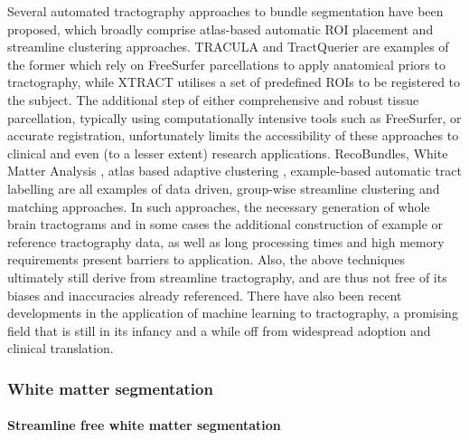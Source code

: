 Several automated tractography approaches to bundle segmentation have been proposed, which broadly comprise atlas-based automatic ROI placement and streamline clustering approaches.
TRACULA and TractQuerier are examples of the former which rely on FreeSurfer parcellations to apply anatomical priors to tractography, while XTRACT \autocite{Warrington2020} utilises a set of predefined ROIs to be registered to the subject.
The additional step of either comprehensive and robust tissue parcellation, typically using computationally intensive tools such as FreeSurfer, or accurate registration, unfortunately limits the accessibility of these approaches to clinical and even (to a lesser extent) research applications.
RecoBundles,\autocite{Garyfallidis2018} White Matter Analysis \autocite{ODonnell2017, ODonnell2007}, atlas based adaptive clustering \autocite{Tunc2014}, example-based automatic tract labelling \autocite{Yoo2015} are all examples of data driven, group-wise streamline clustering and matching approaches.
In such approaches, the necessary generation of whole brain tractograms and in some cases the additional construction of example or reference tractography data, as well as long processing times and high memory requirements\autocite{Wasserthal2018} present barriers to application.
Also, the above techniques ultimately still derive from streamline tractography, and are thus not free of its biases and inaccuracies already referenced.
There have also been recent developments in the application of machine learning to tractography,\autocite{Poulin2019} a promising field that is still in its infancy and a while off from widespread adoption and clinical translation.

\subsubsection{White matter segmentation}


\paragraph{Streamline free white matter segmentation}


